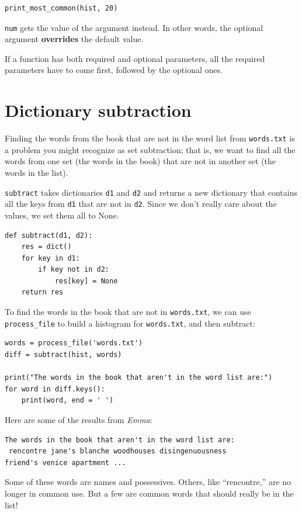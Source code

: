 \documentclass[10pt]{book}
\begin{document}
\beforeverb
\begin{verbatim}
print_most_common(hist, 20)
\end{verbatim}
\afterverb

{\tt num} gets the value of the argument instead.  In other
words, the optional argument {\bf overrides} the default value.


If a function has both required and optional parameters, all
the required parameters have to come first, followed by the
optional ones.


\section{Dictionary subtraction}


Finding the words from the book that are not in the word list
from {\tt words.txt} is a problem you might recognize as set
subtraction; that is, we want to find all the words from one
set (the words in the book) that are not in another set (the
words in the list).

{\tt subtract} takes dictionaries {\tt d1} and {\tt d2} and returns a
new dictionary that contains all the keys from {\tt d1} that are not
in {\tt d2}.  Since we don't really care about the values, we
set them all to None.

\beforeverb
\begin{verbatim}
def subtract(d1, d2):
    res = dict()
    for key in d1:
        if key not in d2:
            res[key] = None
    return res
\end{verbatim}
\afterverb
%
To find the words in the book that are not in {\tt words.txt},
we can use \verb"process_file" to build a histogram for
{\tt words.txt}, and then subtract:

\beforeverb
\begin{verbatim}
words = process_file('words.txt')
diff = subtract(hist, words)

print("The words in the book that aren't in the word list are:")
for word in diff.keys():
    print(word, end = ' ')
\end{verbatim}
\afterverb
%
Here are some of the results from {\em Emma}:

\beforeverb
\begin{verbatim}
The words in the book that aren't in the word list are:
 rencontre jane's blanche woodhouses disingenuousness 
friend's venice apartment ...
\end{verbatim}
\afterverb
%
Some of these words are names and possessives.  Others, like
``rencontre,'' are no longer in common use.  But a few are common
words that should really be in the list!
\end{document}

